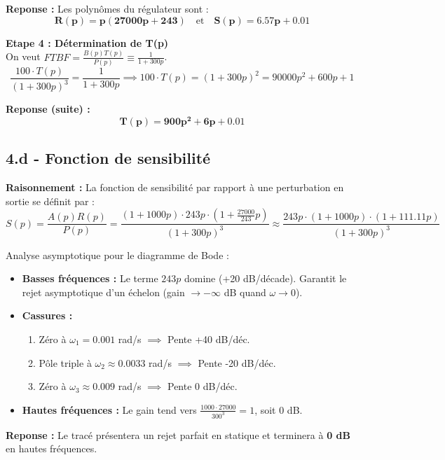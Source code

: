 \documentclass[11pt,a4paper]{article}
\begin{document}
\textbf{Reponse :} Les polynômes du régulateur sont :
$$ 
\mathbf{R(p) = p(27000p + 243)} \quad \text{et} \quad \mathbf{S(p) = 6.57p + 0.01} 
$$

\textbf{Etape 4 : Détermination de T(p)}\\
On veut $FTBF = \frac{B(p)T(p)}{P(p)} \equiv \frac{1}{1+300p}$.
$$ \frac{100 \cdot T(p)}{(1+300p)^3} = \frac{1}{1+300p} \implies 100 \cdot T(p) = (1+300p)^2 = 90000p^2 + 600p + 1 $$

\textbf{Reponse (suite) :}
$$ 
\mathbf{T(p) = 900p^2 + 6p + 0.01} 
$$

\subsection*{4.d - Fonction de sensibilité}

\textbf{Raisonnement :} La fonction de sensibilité par rapport à une perturbation en sortie se définit par :
$$ S(p) = \frac{A(p)R(p)}{P(p)} = \frac{(1+1000p) \cdot 243p \cdot (1 + \frac{27000}{243}p)}{(1+300p)^3} \approx \frac{243p \cdot (1+1000p) \cdot (1+111.11p)}{(1+300p)^3} $$

Analyse asymptotique pour le diagramme de Bode :
\begin{itemize}
    \item \textbf{Basses fréquences :} Le terme $243p$ domine (+20 dB/décade). Garantit le rejet asymptotique d'un échelon (gain $\to -\infty$ dB quand $\omega \to 0$).
    \item \textbf{Cassures :}
    \begin{enumerate}
        \item Zéro à $\omega_1 = 0.001$ rad/s $\implies$ Pente +40 dB/déc.
        \item Pôle triple à $\omega_2 \approx 0.0033$ rad/s $\implies$ Pente -20 dB/déc.
        \item Zéro à $\omega_3 \approx 0.009$ rad/s $\implies$ Pente 0 dB/déc.
    \end{enumerate}
    \item \textbf{Hautes fréquences :} Le gain tend vers $\frac{1000 \cdot 27000}{300^3} = 1$, soit 0 dB.
\end{itemize}

\textbf{Reponse :} Le tracé présentera un rejet parfait en statique et terminera à \textbf{0 dB} en hautes fréquences.
\end{document}
